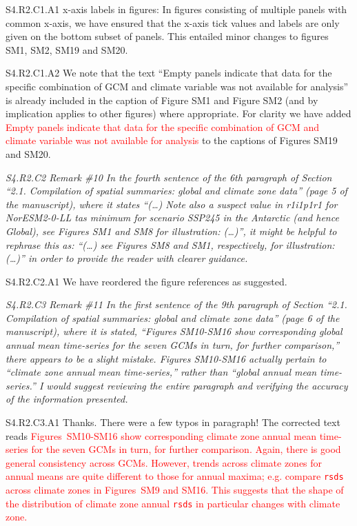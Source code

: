 \documentclass[a4paper,10pt]{article}
\newcommand{\ed}[1]{\textcolor{red}{#1}}
\providecommand{\RS}{\texttt{rsds}\xspace}
\begin{document}
	S4.R2.C1.A1 x-axis labels in figures: In figures consisting of multiple panels with common x-axis, we have ensured that the x-axis tick values and labels are only given on the bottom subset of panels. This entailed minor changes to figures SM1, SM2, SM19 and SM20.
	
	S4.R2.C1.A2 We note that the text ``Empty panels indicate that data for the specific combination of GCM and climate variable was not available for analysis'' is already included in the caption of Figure SM1 and Figure SM2 (and by implication applies to other figures) where appropriate. For clarity we have added \ed{Empty panels indicate that data for the specific combination of GCM and climate variable was not available for analysis} to the captions of Figures SM19 and SM20.

	\emph{S4.R2.C2 Remark \#10 In the fourth sentence of the 6th paragraph of Section “2.1. Compilation of spatial summaries: global and climate zone data” (page 5 of the manuscript), where it states “(…) Note also a suspect value in r1i1p1r1 for NorESM2-0-LL tas minimum for scenario SSP245 in the Antarctic (and hence Global), see Figures SM1 and SM8 for illustration: (…)”, it might be helpful to rephrase this as: “(…) see Figures SM8 and SM1, respectively, for illustration: (…)” in order to provide the reader with clearer guidance.}

	S4.R2.C2.A1 We have reordered the figure references as suggested.

	\emph{S4.R2.C3 Remark \#11 In the first sentence of the 9th paragraph of Section “2.1. Compilation of spatial summaries: global and climate zone data” (page 6 of the manuscript), where it is stated, “Figures SM10-SM16 show corresponding global annual mean time-series for the seven GCMs in turn, for further comparison,” there appears to be a slight mistake. Figures SM10-SM16 actually pertain to “climate zone annual mean time-series,” rather than “global annual mean time-series.” I would suggest reviewing the entire paragraph and verifying the accuracy of the information presented.}

	S4.R2.C3.A1 Thanks. There were a few typos in paragraph! The corrected text reads \ed{Figures~SM10-SM16 show corresponding climate zone annual mean time-series for the seven GCMs in turn, for further comparison. Again, there is good general consistency across GCMs. However, trends across climate zones for annual means are quite different to those for annual maxima; e.g. compare \RS across climate zones in Figures~SM9 and SM16. This suggests that the shape of the distribution of climate zone annual \RS in particular changes with climate zone.}
\end{document}
